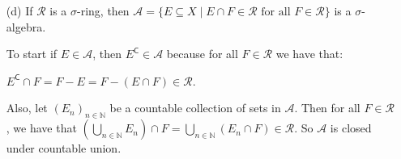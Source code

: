 \documentclass{book}
\newcommand{\exTwoP}{%
   \color{RedViolet}%
   \fontsize{13}{15}\selectfont%
}
\newenvironment{myIndent}{%
   \begin{adjustwidth}{2.5em}{0em}%
}{%
   \end{adjustwidth}%
}
\newcommand{\comp}{\mathsf{C}}
\newcommand{\retTwo}{\hfill\bigbreak}
\begin{document}
\begin{enumerate}
\begin{myIndent}
      Also, let $(E_n)_{n \in \mathbb{N}}$ be a countable collection of sets in $\mathcal{A}$. Then define\\ $A = \{n \in \mathbb{N} \mid E_n^\comp \notin \mathcal{R}\}$ and $B = \{n \in \mathbb{N} \mid E_n^\comp \in \mathcal{R}\}$. Clearly, we have that:

      {\centering $\bigcup\limits_{n \in \mathbb{N}}E_n = \bigcup\limits_{n \in A}E_n \cup \bigcup\limits_{n \in B}E_n = \bigcup\limits_{n \in A}E_n \cup \bigcup\limits_{n \in B}(E_n^\comp)^{\comp}$\\ [2pt]\par}

      Also $\bigcup\limits_{n \in B}(E_n^\comp)^\comp = \left(\bigcap\limits_{n \in B}\hspace{-0.3em}E_n^\comp\right)^{\hspace{-0.3em}\comp}$\hspace{-0.3em}, and by part (a), we know that $E_B \coloneq \bigcap\limits_{n \in B}\hspace{-0.3em}E_n^\comp \in \mathcal{R}$.\retTwo

      Similarly, we know $E_A \coloneq \bigcup\limits_{n \in A}\hspace{-0.3em} E_n \in \mathcal{R}$. So, we've shown that $\bigcup\limits_{n \in \mathbb{N}}E_n = E_A \cup E_B^\comp$\\ [-8pt] where $E_A, E_B \in \mathcal{R}$.\retTwo

      Finally, note that $E_A \cup E_B^\comp = (E_B - E_A)^\comp$. Since $E_B - E_A \in \mathcal{R}$, we know that $(E_B - E_A)^\comp \in \mathcal{A}$. \retTwo
   \end{myIndent}

   \item[(d)] If $\mathcal{R}$ is a $\sigma$-ring, then $\mathcal{A} = \{E \subseteq X \mid E \cap F \in \mathcal{R} \text{ for all } F \in \mathcal{R}\}$ is a $\sigma$-algebra.
   
   \begin{myIndent}\exTwoP
      To start if $E \in \mathcal{A}$, then $E^\comp \in \mathcal{A}$ because for all $F \in \mathcal{R}$ we have that:
      
      {\centering$E^\comp \cap F = F - E = F - (E \cap F) \in \mathcal{R}$.\retTwo\par}

      Also, let $(E_n)_{n \in \mathbb{N}}$ be a countable collection of sets in $\mathcal{A}$. Then for all $F \in \mathcal{R}$, we have that $\left(\bigcup\limits_{n \in \mathbb{N}}E_n\right) \cap F = \bigcup\limits_{n \in \mathbb{N}}(E_n \cap F) \in \mathcal{R}$. So $\mathcal{A}$ is closed under countable union.\newpage
   \end{myIndent}
\end{enumerate}
\end{document}
